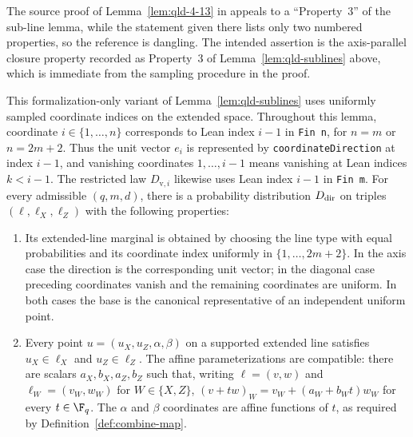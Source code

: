 \begin{remark}
	\label{rem:qld-sublines-property-three}
	The source proof of Lemma~\ref{lem:qld-4-13} in \cite{Ji2020MIPStar}
	appeals to a ``Property~3'' of the sub-line lemma, while the statement
	given there lists only two numbered properties, so the reference is
	dangling. The intended assertion is the axis-parallel closure property
	recorded as Property~3 of Lemma~\ref{lem:qld-sublines} above, which is
	immediate from the sampling procedure in the proof.
\end{remark}

\begin{lemma}
	\label{lem:qld-sublines-direct}
	\leanok
	This formalization-only variant of Lemma~\ref{lem:qld-sublines} uses
	uniformly sampled coordinate indices on the extended space. Throughout
	this lemma, coordinate $i\in\{1,\ldots,n\}$ corresponds to Lean index
	$i-1$ in \texttt{Fin n}, for $n=m$ or $n=2m+2$. Thus the unit vector
	$e_i$ is represented by \texttt{coordinateDirection} at index $i-1$,
	and vanishing coordinates $1,\ldots,i-1$ means vanishing at Lean indices
	$k<i-1$. The restricted law $D_{\mathrm{v},i}$ likewise uses Lean
	index $i-1$ in \texttt{Fin m}. For every
	admissible $(q,m,d)$, there is a probability distribution $D_{\rm dir}$
	on triples $(\ell,\ell_X,\ell_Z)$ with the following properties:
	\begin{enumerate}
		\item Its extended-line marginal is obtained by choosing the line
		type with equal probabilities and its coordinate index uniformly in
		$\{1,\ldots,2m+2\}$. In the axis case the direction is the
		corresponding unit vector; in the diagonal case preceding coordinates
		vanish and the remaining coordinates are uniform. In both cases the
		base is the canonical representative of an independent uniform point.
		\item Every point $u=(u_X,u_Z,\alpha,\beta)$ on a supported extended
		line satisfies $u_X\in\ell_X$ and $u_Z\in\ell_Z$. The affine
		parameterizations are compatible: there are scalars $a_X,b_X,a_Z,b_Z$
		such that, writing $\ell=(v,w)$ and
		$\ell_W=(v_W,w_W)$ for $W\in\{X,Z\}$,
		$(v+tw)_W=v_W+(a_W+b_Wt)w_W$ for every $t\in\F_q$.
		The $\alpha$ and $\beta$ coordinates are affine functions of $t$,
		as required by Definition~\ref{def:combine-map}.

\end{enumerate}
\end{lemma}
